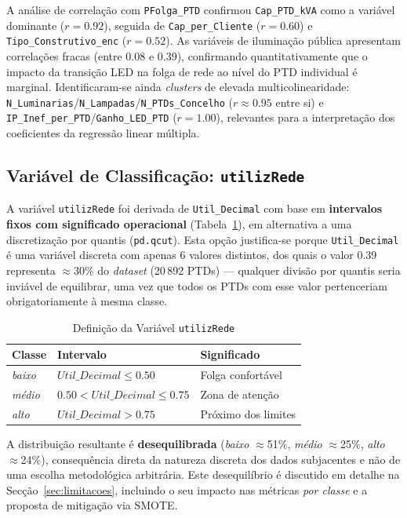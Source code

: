 \documentclass[conference]{IEEEtran}
\begin{document}
A análise de correlação com \texttt{PFolga\_PTD} confirmou \texttt{Cap\_PTD\_kVA} como a variável dominante ($r = 0.92$), seguida de \texttt{Cap\_per\_Cliente} ($r = 0.60$) e \texttt{Tipo\_Construtivo\_enc} ($r = 0.52$). As variáveis de iluminação pública apresentam correlações fracas (entre 0.08 e 0.39), confirmando quantitativamente que o impacto da transição LED na folga de rede ao nível do PTD individual é marginal. Identificaram-se ainda \textit{clusters} de elevada multicolinearidade: \texttt{N\_Luminarias}/\texttt{N\_Lampadas}/\texttt{N\_PTDs\_Concelho} ($r \approx 0.95$ entre si) e \texttt{IP\_Inef\_per\_PTD}/\texttt{Ganho\_LED\_PTD} ($r = 1.00$), relevantes para a interpretação dos coeficientes da regressão linear múltipla.


\subsection{Variável de Classificação: \texttt{utilizRede}}

A variável \texttt{utilizRede} foi derivada de \texttt{Util\_Decimal} com base em \textbf{intervalos fixos com significado operacional} (Tabela~\ref{tab:classes}), em alternativa a uma discretização por quantis (\texttt{pd.qcut}). Esta opção justifica-se porque \texttt{Util\_Decimal} é uma variável discreta com apenas 6 valores distintos, dos quais o valor 0.39 representa $\approx$30\% do \textit{dataset} (20\,892 PTDs) --- qualquer divisão por quantis seria inviável de equilibrar, uma vez que todos os PTDs com esse valor pertenceriam obrigatoriamente à mesma classe.

\begin{table}[htbp]
\caption{Definição da Variável \texttt{utilizRede}}
\label{tab:classes}
\centering
\begin{tabular}{lll}
\hline
\textbf{Classe} & \textbf{Intervalo} & \textbf{Significado} \\
\hline
\textit{baixo} & $Util\_Decimal \leq 0.50$ & Folga confortável \\
\textit{médio} & $0.50 < Util\_Decimal \leq 0.75$ & Zona de atenção \\
\textit{alto} & $Util\_Decimal > 0.75$ & Próximo dos limites \\
\hline
\end{tabular}
\end{table}

A distribuição resultante é \textbf{desequilibrada} (\textit{baixo} $\approx$51\%, \textit{médio} $\approx$25\%, \textit{alto} $\approx$24\%), consequência direta da natureza discreta dos dados subjacentes e não de uma escolha metodológica arbitrária. Este desequilíbrio é discutido em detalhe na Secção~\ref{sec:limitacoes}, incluindo o seu impacto nas métricas \textit{por classe} e a proposta de mitigação via SMOTE.
\end{document}
